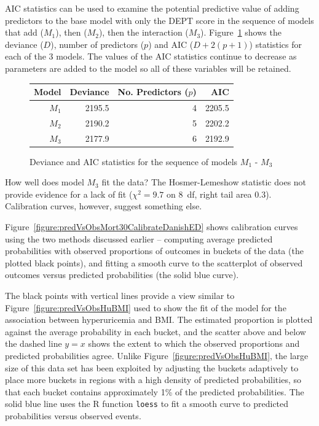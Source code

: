 AIC statistics can be used to examine the potential predictive value of adding predictors to the base model with only the DEPT score in the sequence of models that add   ($M_1$), then  ($M_2$), then the interaction  ($M_3$).  Figure~\ref{DevianceAICDeptAgeSexFullData} shows the deviance ($D$), number of predictors ($p$) and AIC ($D + 2(p+1)$) statistics for each of the 3 models.  The values of the AIC statistics continue to decrease as parameters are added to the model so all of these variables will be retained.  

\begin{figure}[ht]
  \centering
    \begin{tabular}{rrrr}
    \hline
      Model & Deviance & No. Predictors ($p$) & AIC \\
      \hline
      $M_1$ & 2195.5 &  4 & 2205.5 \\
      $M_2$ & 2190.2 &  5 & 2202.2 \\
      $M_3$ & 2177.9 &  6 & 2192.9 \\
      \hline
    \end{tabular}
  \caption{Deviance and AIC statistics for the sequence of models $M_1$ - $M_3$}
  \label{DevianceAICDeptAgeSexFullData}
\end{figure}

How well does model $M_3$ fit the data?  The Hosmer-Lemeshow statistic does not provide evidence for a lack of fit ($\chi^2 = 9.7$ on 8~df, right tail area $0.3$).   Calibration curves, however, suggest something else.

Figure~\ref{figure:predVsObsMort30CalibrateDanishED} shows calibration curves using the two methods discussed earlier -- computing average predicted probabilities with observed proportions of outcomes in buckets of the data (the plotted black points), and fitting a smooth curve to the scatterplot of observed outcomes versus predicted probabilities (the solid blue curve). 

The black points with vertical lines provide a view similar to Figure~\ref{figure:predVsObsHuBMI} used to show the fit of the model for the association between hyperuricemia and BMI\@. The estimated proportion is plotted against the average probability in each bucket, and the scatter above and below the dashed line $y = x$ shows the extent to which the observed proportions and predicted probabilities agree.   Unlike Figure~\ref{figure:predVsObsHuBMI},  the large size of this data set has been exploited by adjusting the buckets adaptively to place more buckets in regions with a high density of predicted probabilities, so that each bucket contains approximately 1\% of the predicted probabilities. The solid blue line uses the \textsf{R} function \texttt{loess} to fit a smooth curve to predicted probabilities versus observed events.

